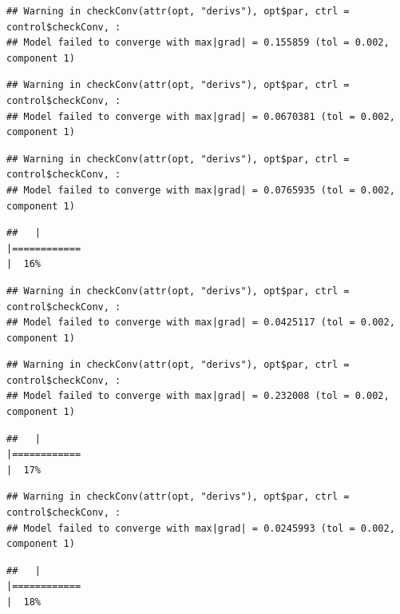 \documentclass[
  12pt,
]{book}
\begin{document}
\begin{verbatim}
## Warning in checkConv(attr(opt, "derivs"), opt$par, ctrl = control$checkConv, :
## Model failed to converge with max|grad| = 0.155859 (tol = 0.002, component 1)
\end{verbatim}

\begin{verbatim}
## Warning in checkConv(attr(opt, "derivs"), opt$par, ctrl = control$checkConv, :
## Model failed to converge with max|grad| = 0.0670381 (tol = 0.002, component 1)
\end{verbatim}

\begin{verbatim}
## Warning in checkConv(attr(opt, "derivs"), opt$par, ctrl = control$checkConv, :
## Model failed to converge with max|grad| = 0.0765935 (tol = 0.002, component 1)
\end{verbatim}

\begin{verbatim}
##   |                                                                              |============                                                          |  16%
\end{verbatim}

\begin{verbatim}
## Warning in checkConv(attr(opt, "derivs"), opt$par, ctrl = control$checkConv, :
## Model failed to converge with max|grad| = 0.0425117 (tol = 0.002, component 1)
\end{verbatim}

\begin{verbatim}
## Warning in checkConv(attr(opt, "derivs"), opt$par, ctrl = control$checkConv, :
## Model failed to converge with max|grad| = 0.232008 (tol = 0.002, component 1)
\end{verbatim}

\begin{verbatim}
##   |                                                                              |============                                                          |  17%
\end{verbatim}

\begin{verbatim}
## Warning in checkConv(attr(opt, "derivs"), opt$par, ctrl = control$checkConv, :
## Model failed to converge with max|grad| = 0.0245993 (tol = 0.002, component 1)
\end{verbatim}

\begin{verbatim}
##   |                                                                              |============                                                          |  18%
\end{verbatim}
\end{document}
